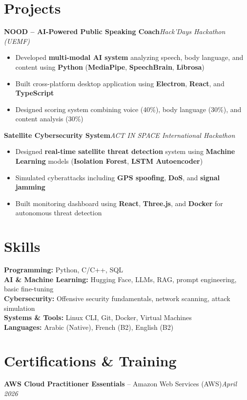 \documentclass[10pt,a4paper]{article}
\newcommand{\entry}[3]{\textbf{#1}\hfill\textit{\small #2}\\#3\par}
\begin{document}
\section{Projects}
\entry{NOOD -- AI-Powered Public Speaking Coach}{Hack'Days Hackathon (UEMF)}{}
\vspace{-\baselineskip}
\begin{itemize}
  \item Developed \textbf{multi-modal AI system} analyzing speech, body language, and content using \textbf{Python} (\textbf{MediaPipe}, \textbf{SpeechBrain}, \textbf{Librosa})
  \item Built cross-platform desktop application using \textbf{Electron}, \textbf{React}, and \textbf{TypeScript}
  \item Designed scoring system combining voice (40\%), body language (30\%), and content analysis (30\%)
\end{itemize}
\vspace{2pt}
\entry{Satellite Cybersecurity System}{ACT IN SPACE International Hackathon}{}
\vspace{-\baselineskip}
\begin{itemize}
  \item Designed \textbf{real-time satellite threat detection} system using \textbf{Machine Learning} models (\textbf{Isolation Forest}, \textbf{LSTM Autoencoder})
  \item Simulated cyberattacks including \textbf{GPS spoofing}, \textbf{DoS}, and \textbf{signal jamming}
  \item Built monitoring dashboard using \textbf{React}, \textbf{Three.js}, and \textbf{Docker} for autonomous threat detection
\end{itemize}

\section{Skills}
\textbf{Programming:} Python, C/C++, SQL\\
\textbf{AI \& Machine Learning:} Hugging Face, LLMs, RAG, prompt engineering, basic fine-tuning\\
\textbf{Cybersecurity:} Offensive security fundamentals, network scanning, attack simulation\\
\textbf{Systems \& Tools:} Linux CLI, Git, Docker, Virtual Machines\\
\textbf{Languages:} Arabic (Native), French (B2), English (B2)

\section{Certifications \& Training}
\textbf{AWS Cloud Practitioner Essentials} -- Amazon Web Services (AWS)\hfill\textit{\small April 2026}
\end{document}
